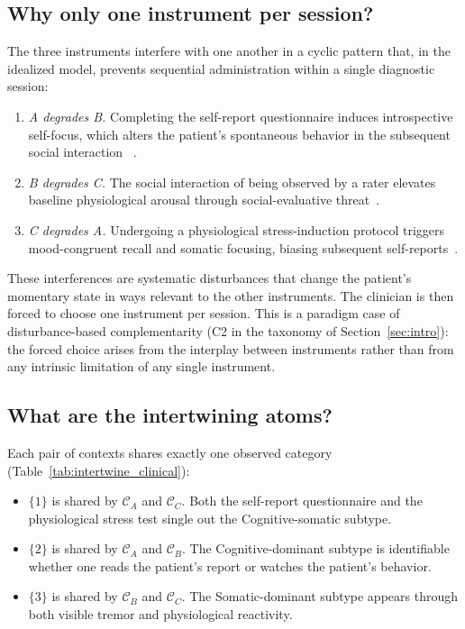 \documentclass[aps,pra,twocolumn,superscriptaddress,floatfix,longbibliography]{revtex4-2}
\begin{document}
\subsection{Why only one instrument per session?}

The three instruments interfere with one another in a cyclic pattern
that, in the idealized model, prevents sequential administration
within a single diagnostic session:
\begin{enumerate}
\item \emph{A degrades B.} Completing the self-report questionnaire
induces introspective self-focus, which alters the patient's
spontaneous behavior in the subsequent social interaction
~\cite{Duval1972}.
\item \emph{B degrades C.} The social interaction of being observed
by a rater elevates baseline physiological arousal through
social-evaluative threat~\cite{Dickerson2004}.
\item \emph{C degrades A.} Undergoing a physiological stress-induction
protocol triggers mood-congruent recall and somatic focusing,
biasing subsequent self-reports~\cite{Bower1981}.
\end{enumerate}
These interferences are systematic disturbances that change the
patient's momentary state in ways relevant to the other instruments.
The clinician is then forced to choose one instrument per session.
This is a paradigm case of disturbance-based complementarity (C2 in
the taxonomy of Section~\ref{sec:intro}): the forced choice arises
from the interplay between instruments rather than from any
intrinsic limitation of any single instrument.

\subsection{What are the intertwining atoms?}

Each pair of contexts shares exactly one observed category
(Table~\ref{tab:intertwine_clinical}):
\begin{itemize}
\item $\{1\}$ is shared by $\mathcal{C}_A$ and $\mathcal{C}_C$.
Both the self-report questionnaire and the physiological stress test
single out the Cognitive-somatic subtype.
\item $\{2\}$ is shared by $\mathcal{C}_A$ and $\mathcal{C}_B$.
The Cognitive-dominant subtype is identifiable whether one reads the
patient's report or watches the patient's behavior.
\item $\{3\}$ is shared by $\mathcal{C}_B$ and $\mathcal{C}_C$.
The Somatic-dominant subtype appears through both visible tremor and
physiological reactivity.
\end{itemize}
\end{document}
